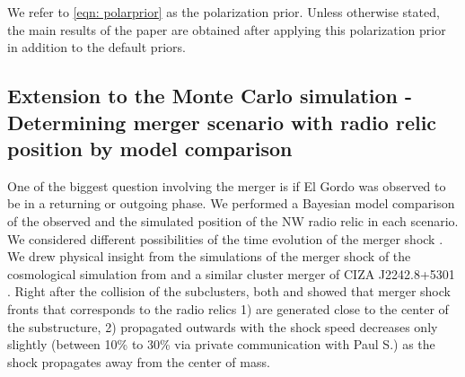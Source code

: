 We refer to \ref{eqn: polarprior} as the polarization prior. Unless
otherwise stated, the main results of the paper are obtained after applying
this polarization prior in addition to the default priors.

\subsection{Extension to the Monte Carlo simulation - Determining merger
scenario with radio relic position by model comparison}
%

One of the biggest question involving the merger is if El Gordo was
observed to be in a returning or outgoing phase.
We performed a Bayesian model comparison of the observed and the
simulated position of the NW radio relic in each scenario.
We considered different possibilities of the time evolution of the merger shock
.  We drew physical insight from the
simulations of the merger shock of the cosmological simulation from
\citet{Paul2011b} and a similar cluster merger of CIZA J2242.8+5301
\citep{VanWeerenRJ2011}. 
Right after the collision of the subclusters, both \citet{Paul2011b} and
\citet{VanWeerenRJ2011} showed that
merger shock fronts that corresponds to the radio relics 1) are generated
close to the center of the substructure, 2) propagated outwards with  
 the shock speed decreases only slightly (between 10\% to 30\% via private
 communication with Paul S.) as the
 shock propagates away from the center of mass.  
\par  

